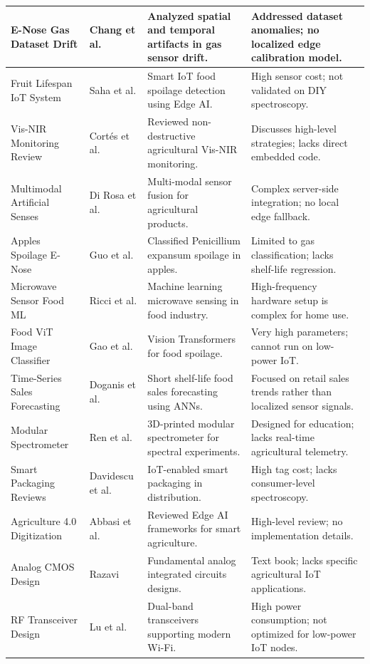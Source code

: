 \begin{table}[H]
\begin{tabular}{|p{2.5cm}|p{2cm}|p{4.2cm}|p{4.2cm}|}
E-Nose Gas Dataset Drift \cite{Hosseinmardi2023} & Chang et al. & Analyzed spatial and temporal artifacts in gas sensor drift. & Addressed dataset anomalies; no localized edge calibration model. \\ \hline
Fruit Lifespan IoT System \cite{SmartIoTEdgeAI2022} & Saha et al. & Smart IoT food spoilage detection using Edge AI. & High sensor cost; not validated on DIY spectroscopy. \\ \hline
Vis-NIR Monitoring Review \cite{NonDestructiveChlorophyll2022} & Cort{\'e}s et al. & Reviewed non-destructive agricultural Vis-NIR monitoring. & Discusses high-level strategies; lacks direct embedded code. \\ \hline
Multimodal Artificial Senses \cite{MultiModalSensorFusion2023} & Di Rosa et al. & Multi-modal sensor fusion for agricultural products. & Complex server-side integration; no local edge fallback. \\ \hline
Apples Spoilage E-Nose \cite{Karadag2020} & Guo et al. & Classified Penicillium expansum spoilage in apples. & Limited to gas classification; lacks shelf-life regression. \\ \hline
Microwave Sensor Food ML \cite{Impedance2023} & Ricci et al. & Machine learning microwave sensing in food industry. & High-frequency hardware setup is complex for home use. \\ \hline
Food ViT Image Classifier \cite{VisionBasedTransformer2023} & Gao et al. & Vision Transformers for food spoilage. & Very high parameters; cannot run on low-power IoT. \\ \hline
Time-Series Sales Forecasting \cite{AttentionLSTMForecasting2023} & Doganis et al. & Short shelf-life food sales forecasting using ANNs. & Focused on retail sales trends rather than localized sensor signals. \\ \hline
Modular Spectrometer \cite{VirtualCalibration2023} & Ren et al. & 3D-printed modular spectrometer for spectral experiments. & Designed for education; lacks real-time agricultural telemetry. \\ \hline
Smart Packaging Reviews \cite{IoTEnabledSmartPackaging2020} & Davidescu et al. & IoT-enabled smart packaging in distribution. & High tag cost; lacks consumer-level spectroscopy. \\ \hline
Agriculture 4.0 Digitization \cite{EdgeAIReview2022} & Abbasi et al. & Reviewed Edge AI frameworks for smart agriculture. & High-level review; no implementation details. \\ \hline
Analog CMOS Design \cite{Razavi2000} & Razavi & Fundamental analog integrated circuits designs. & Text book; lacks specific agricultural IoT applications. \\ \hline
RF Transceiver Design \cite{Lu2023} & Lu et al. & Dual-band transceivers supporting modern Wi-Fi. & High power consumption; not optimized for low-power IoT nodes. \\ \hline
\end{tabular}
\end{table}

